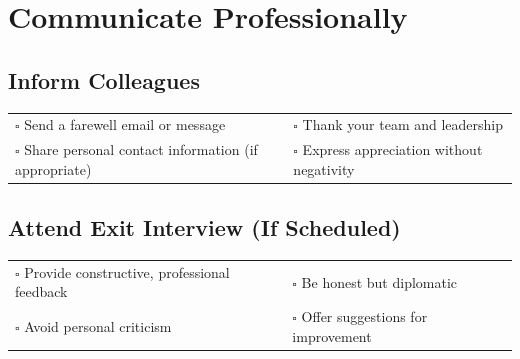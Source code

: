 
\section{Communicate Professionally}
\label{sec:communicate}

\subsection{Inform Colleagues}

\begin{tabular}{p{9cm} p{8cm}}
$\square$ Send a farewell email or message & $\square$ Thank your team and leadership \\ 
$\square$ Share personal contact information (if appropriate) & $\square$ Express appreciation without negativity \\ 
\end{tabular}

\subsection{Attend Exit Interview (If Scheduled)}

\begin{tabular}{p{9cm} p{8cm}}
$\square$ Provide constructive, professional feedback & $\square$ Be honest but diplomatic \\ 
$\square$ Avoid personal criticism & $\square$ Offer suggestions for improvement \\ 
\end{tabular}


